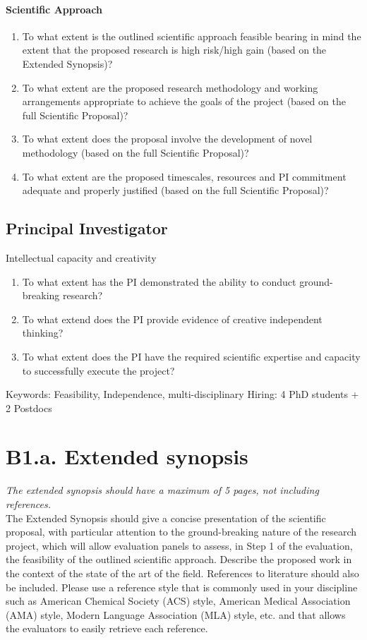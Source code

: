 \paragraph{Scientific Approach}
\begin{enumerate}
	\item To what extent is the outlined scientific approach feasible bearing in mind the extent that the
	proposed research is high risk/high gain (based on the Extended Synopsis)?
	\item To what extent are the proposed research methodology and working arrangements appropriate to
	achieve the goals of the project (based on the full Scientific Proposal)?
	\item To what extent does the proposal involve the development of novel methodology (based on the full
	Scientific Proposal)?
	\item To what extent are the proposed timescales, resources and PI commitment adequate and properly
	justified (based on the full Scientific Proposal)?
\end{enumerate}
\subsection{Principal Investigator}
Intellectual capacity and creativity

\begin{enumerate}
	\item To what extent has the PI demonstrated the ability to conduct ground-breaking research?
	\item To what extend does the PI provide evidence of creative independent thinking?
	\item To what extent does the PI have the required scientific expertise and capacity to successfully execute
	the project?
\end{enumerate}

Keywords: Feasibility, Independence, multi-disciplinary 
Hiring: 4 PhD students + 2 Postdocs
\section*{B1.a. Extended synopsis}

\textit{The extended synopsis should have a maximum of 5 pages, not including references.}\\

The Extended Synopsis should give a concise presentation of the scientific proposal, with particular attention to the ground-breaking nature of the research project, which will allow evaluation panels to assess, in Step 1 of the evaluation, the feasibility of the outlined scientific approach. Describe the proposed work in the context of the state of the art of the field. References to literature should also be included. Please use a reference style that is commonly used in your discipline such as American Chemical Society (ACS) style, American Medical Association (AMA) style, Modern Language Association (MLA) style, etc. and that allows the evaluators to easily retrieve each reference.
%


